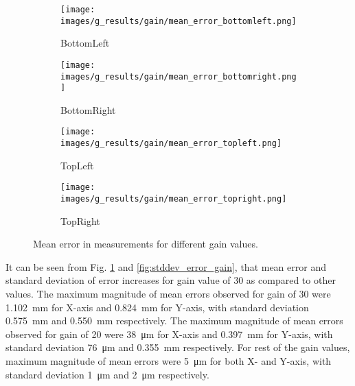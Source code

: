 
    \begin{figure}[ht]
        \centering
        \begin{subfigure}[b]{0.46\textwidth}
            \centering
            \texttt{[image: images/g\_results/gain/mean\_error\_bottomleft.png]}
            \caption{\textsf{BottomLeft}}
        \end{subfigure}
        \hspace{1cm}
        \begin{subfigure}[b]{0.46\textwidth}
            \centering
            \texttt{[image: images/g\_results/gain/mean\_error\_bottomright.png]}
            \caption{\textsf{BottomRight}}
        \end{subfigure}

        \vspace{5mm}
        
        \begin{subfigure}[b]{0.46\textwidth}
            \centering
            \texttt{[image: images/g\_results/gain/mean\_error\_topleft.png]}
            \caption{\textsf{TopLeft}}
        \end{subfigure}
        \hspace{1cm}
        \begin{subfigure}[b]{0.46\textwidth}
            \centering
            \texttt{[image: images/g\_results/gain/mean\_error\_topright.png]}
            \caption{\textsf{TopRight}}
        \end{subfigure}

        \caption{Mean error in measurements for different gain values.}
        \label{fig:mean_error_gain}
    \end{figure}

    \noindent It can be seen from Fig. \ref{fig:mean_error_gain} and \ref{fig:stddev_error_gain}, that mean error and standard deviation of error increases for gain value of 30 as compared to other values. The maximum magnitude of mean errors observed for gain of 30 were \SI{1.102}{\milli\meter} for X-axis and \SI{0.824}{\milli\meter} for Y-axis, with standard deviation \SI{0.575}{\milli\meter} and \SI{0.550}{\milli\meter} respectively. The maximum magnitude of mean errors observed for gain of 20 were \SI{38}{\micro\meter} for X-axis and \SI{0.397}{\milli\meter} for Y-axis, with standard deviation \SI{76}{\micro\meter} and \SI{0.355}{\milli\meter} respectively. For rest of the gain values, maximum magnitude of mean errors were \SI{5}{\micro\meter} for both X- and Y-axis, with standard deviation \SI{1}{\micro\meter} and \SI{2}{\micro\meter} respectively.

